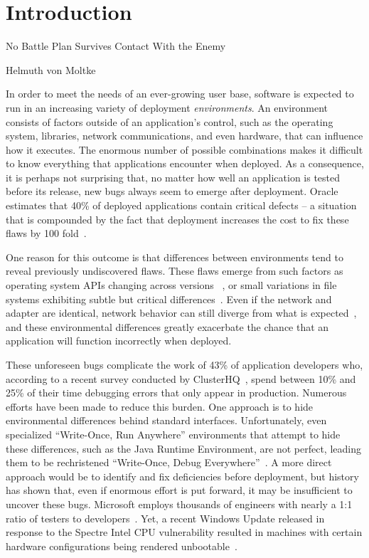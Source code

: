 \chapter{Introduction}
\label{chap:intro}

\epigraph{No Battle Plan Survives Contact With the Enemy}{Helmuth von Moltke}

In order to meet the needs of an ever-growing user base,
software is expected to run in an increasing variety of deployment \emph{environments}.
An environment consists of factors outside of an application's control,
such as the operating system,
libraries,
network communications,
and even hardware,
that can influence how it executes.
The enormous number of possible combinations makes it difficult to know everything that applications encounter when deployed.
As a consequence, it is perhaps not surprising that, no matter how well an application is tested before its release,
new bugs always seem to emerge after deployment.
Oracle estimates that 40\% of deployed applications
contain critical defects -- a situation that is compounded
by the fact that deployment
increases the cost to fix these flaws by 100 fold~\cite{OracleAppQuality}.

One reason for this outcome
is that differences between environments tend to
reveal previously undiscovered flaws.
These flaws emerge from
such factors as
operating system APIs changing across versions
~\cite{LinuxGlibcChanges, WinAPICompat, MuslDifferences},
or small variations in file systems exhibiting subtle but critical
differences~\cite{EXT4Layout, AppleHFS, WindowsNTFS}.
Even if the network and adapter are identical,
network behavior can still diverge from what is expected~\cite{vbox,
NMAPOSDifferences, VMWareNATFailure},
and these environmental differences greatly exacerbate
the chance that an application will function incorrectly when deployed.

These unforeseen bugs
complicate the work of 43\% of application developers who, according to a
recent survey conducted by ClusterHQ~\cite{ClusterHQSurvey},
spend between 10\% and 25\% of their time
debugging errors that only appear in production.
Numerous efforts have been made to reduce this burden.
One approach
is to hide environmental differences behind standard interfaces.
Unfortunately,
even specialized ``Write-Once, Run Anywhere'' environments
that attempt to hide these differences,
such as the Java Runtime Environment,
are not perfect,
leading them to be rechristened ``Write-Once, Debug Everywhere''~\cite{WODE}.
A more direct approach would be
to identify and fix deficiencies before deployment,
but history has shown that,
even if enormous effort is put forward,
it may be insufficient to uncover these bugs.
Microsoft employs thousands of engineers with nearly a
1:1 ratio of testers to developers~\cite{Page2009}.
Yet, a recent Windows Update released
in response to the Spectre Intel CPU vulnerability
resulted in machines with certain hardware configurations
being rendered unbootable~\cite{kb4056892}.

